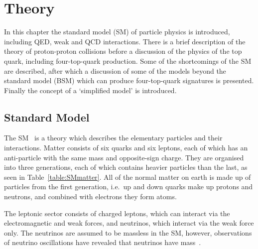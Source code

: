 \chapter{Theory}
\label{c:theory}
\vspace{0.6cm}
In this chapter the standard model (SM) of particle physics is introduced, including QED, weak and QCD interactions. There is a brief description of the theory of proton-proton collisions before a discussion of the physics of the top quark, including four-top-quark production. Some of the shortcomings of the SM are described, after which a discussion of some of the models beyond the standard model (BSM) which can produce four-top-quark signatures is presented. Finally the concept of a `simplified model' is introduced.

\section{Standard Model}

The SM~\cite{Glashow:1961tr,PhysRevLett.19.1264,Salam:1968rm,DGriff} is a theory which describes the elementary particles and their interactions. Matter consists of six quarks and six leptons, each of which has an anti-particle with the same mass and opposite-sign charge. They are organised into three generations, each of which contains heavier particles than the last, as seen in Table~\ref{table:SMmatter}. All of the normal matter on earth is made up of particles from the first generation, i.e.~up and down quarks make up protons and neutrons, and combined with electrons they form atoms. 

The leptonic sector consists of charged leptons, which can interact via the electromagnetic and weak forces, and neutrinos, which interact via the weak force only. The neutrinos are assumed to be massless in the SM, however, observations of neutrino oscillations have revealed that neutrinos have mass~\cite{PhysRevC.88.025501}.

